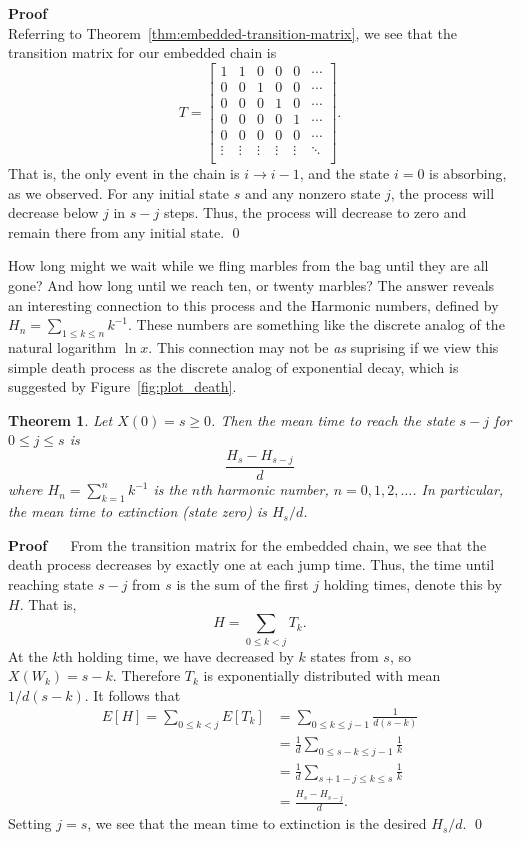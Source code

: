 \documentclass[12pt]{article}
\renewenvironment{proof}{%
\begin{adjustwidth}{\parindent}{\parindent}
{\bf Proof} \ \ 
}{\qed
\end{adjustwidth}}
\newtheorem{thm}{Theorem}[section]
\theoremstyle{definition}
\begin{document}
\begin{proof}
\[\]
Referring to Theorem~\ref{thm:embedded-transition-matrix}, we see that the
transition matrix for our embedded chain is
\[
    T =
    \begin{bmatrix}
        1 & 1 & 0 & 0 & 0 & \cdots \\
        0 & 0 & 1 & 0 & 0 & \cdots \\
        0 & 0 & 0 & 1 & 0 & \cdots \\
        0 & 0 & 0 & 0 & 1 & \cdots \\
        0 & 0 & 0 & 0 & 0 & \cdots \\
        \vdots & \vdots & \vdots & \vdots & \vdots & \ddots \\
    \end{bmatrix}.
\]
That is, the only event in the chain is $i \to i - 1$, and the state $i = 0$ is
absorbing, as we observed. For any initial state $s$ and any nonzero state $j$,
the process will decrease below $j$ in $s - j$ steps. Thus, the process will
decrease to zero and remain there from any initial state.
\end{proof}

How long might we wait while we fling marbles from the bag until they are all
gone? And how long until we reach ten, or twenty marbles? The answer reveals an
interesting connection to this process and the Harmonic numbers, defined by
$H_n = \sum_{1 \leq k \leq n} k^{-1}$. These numbers are something like the
discrete analog of the natural logarithm $\ln{x}$. This connection may not be
\emph{as} suprising if we view this simple death process as the discrete analog
of exponential decay, which is suggested by Figure~\ref{fig:plot_death}.

\begin{thm}
    \label{thm:mean-death-time}
    Let $X(0) = s \geq 0$. Then the mean time to reach the state $s - j$ for $0
    \leq j \leq s$ is $$\frac{H_s - H_{s - j}}{d}$$ where $H_n = \sum_{k = 1}^n
    k^{-1}$ is the $n$th harmonic number, $n = 0, 1, 2, \dots$. In particular,
    the mean time to extinction (state zero) is $H_s/d$.
\end{thm}

\begin{proof}
From the transition matrix for the embedded chain, we see that the death
process decreases by exactly one at each jump time. Thus, the time until
reaching state $s - j$ from $s$ is the sum of the first $j$ holding times,
denote this by $H$. That is, $$H = \sum_{0 \leq k < j} T_k.$$ At the $k$th
holding time, we have decreased by $k$ states from $s$, so $X(W_k) = s - k$.
Therefore $T_k$ is exponentially distributed with mean $1/d(s - k)$. It follows
that
\begin{align*}
    E[H] = \sum_{0 \leq k < j} E[T_k]
         &= \sum_{0 \leq k \leq j - 1} \frac{1}{d (s - k)} \\
         &= \frac{1}{d} \sum_{0 \leq s - k \leq j - 1} \frac{1}{k} \\
         &= \frac{1}{d} \sum_{s + 1 - j \leq k \leq s} \frac{1}{k} \\
         &= \frac{H_s - H_{s - j}}{d}.
\end{align*}
Setting $j = s$, we see that the mean time to extinction is the desired
$H_s/d$.
\end{proof}
\end{document}
